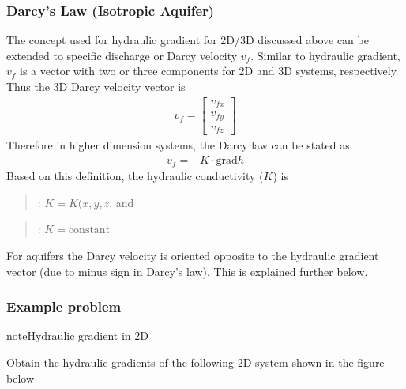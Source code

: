 \documentclass[letterpaper,10pt,english]{sphinxmanual}
\begin{document}
\subsubsection{Darcy’s Law (Isotropic Aquifer)}
\label{\detokenize{contents/flow/lecture_06/16_darcy_law_3D:darcy-s-law-isotropic-aquifer}}
The concept used for hydraulic gradient for 2D/3D discussed above can be extended to specific discharge or Darcy velocity \(v_f\). Similar to hydraulic gradient, \(v_f\) is a vector with two or three components for 2D and 3D systems, respectively. Thus the 3D Darcy velocity vector is
\begin{equation*}
\begin{split}
v_f = \begin{bmatrix}
v_{fx}
\\ 
v_{fy}
\\ 
v_{fz}
\end{bmatrix}   
\end{split}
\end{equation*}
Therefore in higher dimension systems, the Darcy law can be stated as
\begin{equation*}
\begin{split}
v_f = - K \cdot \text{grad}h
\end{split}
\end{equation*}
Based on this definition, the hydraulic conductivity (\(K\)) is
\begin{quote}

: \(K = K(x,y,z\), and
\end{quote}
\begin{quote}

: \(K = \text{constant}\)
\end{quote}

For  aquifers the Darcy velocity is oriented opposite to the hydraulic gradient vector (due to minus sign in Darcy’s law). This is explained further below.


\subsubsection{Example problem}
\label{\detokenize{contents/flow/lecture_06/16_darcy_law_3D:example-problem}}
\begin{sphinxadmonition}{note}{Hydraulic gradient in 2D}

Obtain the hydraulic gradients of the following 2D system shown in the figure below
\end{sphinxadmonition}
\end{document}
